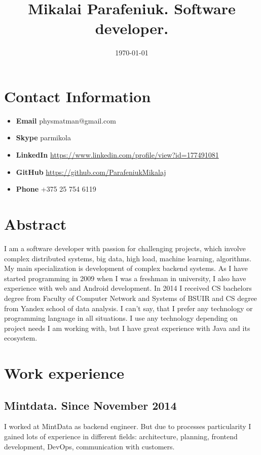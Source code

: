 \documentclass{article}
\title{Mikalai Parafeniuk. Software developer.}
\date{\today}
\begin{document}
\maketitle

\section*{Contact Information}
\begin{itemize}
\item \textbf{Email} physmatman@gmail.com
\item \textbf{Skype} parmikola
\item \textbf{LinkedIn} \url{https://www.linkedin.com/profile/view?id=177491081}
\item \textbf{GitHub} \url{https://github.com/ParafeniukMikalaj}
\item \textbf{Phone} +375 25 754 6119
\end{itemize}

\section*{Abstract}
I am a software developer with passion for challenging projects, which involve complex distributed systems, big data, high load, machine learning, algorithms. My main specialization is development of complex backend systems. As I have started programming in 2009 when I was a freshman in university, I also have experience with web and Android development. In 2014 I received CS bachelors degree from Faculty of Computer Network and Systems of BSUIR and CS degree from Yandex school of data analysis. I can't say, that I prefer any technology or programming language in all situations. I use any technology depending on project needs I am working with, but I have great experience with Java and its ecosystem.

\section*{Work experience}

\subsection*{Mintdata. Since November 2014}
I worked at MintData as backend engineer. But due to processes particularity I gained lots of experience in different fields: architecture, planning, frontend development, DevOps, communication with customers.
\end{document}
